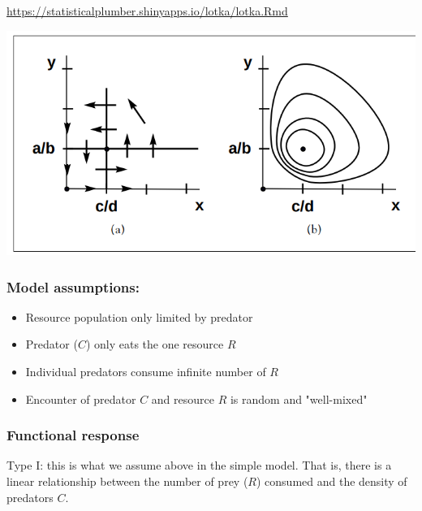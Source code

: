 \documentclass[12pt]{article}
\begin{document}
\bigskip

\url{https://statisticalplumber.shinyapps.io/lotka/lotka.Rmd} \\

\bigskip








\includegraphics[width=\textwidth]{figs/lv.png}









\subsubsection*{Model assumptions:}
\begin{itemize}
	\item Resource population only limited by predator
	\item Predator ($C$) only eats the one resource $R$
	\item Individual predators consume infinite number of $R$
	\item Encounter of predator $C$ and resource $R$ is random and "well-mixed"
\end{itemize}









\bigskip

\subsubsection*{Functional response}

Type I: this is what we assume above in the simple model. That is, there is a linear relationship between the number of prey ($R$) consumed and the density of predators $C$.  \\
\end{document}
